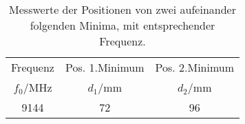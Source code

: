 \begin{table}[!h]
	\centering
	\begin{tabular}{ccc}
		\toprule
		Frequenz & Pos. 1.Minimum & Pos. 2.Minimum\\
		$f_0$/\si{MHz} & $d_1$/\si{mm} & $d_2$/\si{mm}\\
\midrule
		\num{9144} & \num{72} & \num{96}\\
		\bottomrule
	\end{tabular}
	\caption{Messwerte der Positionen von zwei aufeinander folgenden Minima, mit entsprechender Frequenz. 
                 \label{tab:Elektrische Abstimmung}}
\end{table}
